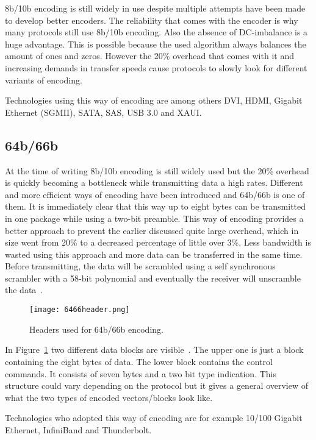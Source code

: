 8b/10b encoding is still widely in use despite multiple attempts have been made to develop better encoders. The reliability that comes with the encoder is why many protocols still use 8b/10b encoding. Also the absence of DC-imbalance is a huge advantage. This is possible because the used algorithm always balances the amount of ones and zeros. However the 20\% overhead that comes with it and increasing demands in transfer speeds cause protocols to slowly look for different variants of encoding.

Technologies using this way of encoding are among others DVI, HDMI, Gigabit Ethernet (SGMII), SATA, SAS, USB 3.0 and XAUI.


\subsection{64b/66b}
At the time of writing 8b/10b encoding is still widely used but the 20\% overhead is quickly becoming a bottleneck while transmitting data a high rates. Different and more efficient ways of encoding have been introduced and 64b/66b is one of them. It is immediately clear that this way up to eight bytes can be transmitted in one package while using a two-bit preamble. This way of encoding provides a better approach to prevent the earlier discussed quite large overhead, which in size went from 20\% to a decreased percentage of little over 3\%. Less bandwidth is wasted using this approach and more data can be transferred in the same time. Before transmitting, the data will be scrambled using a self synchronous scrambler with a 58-bit polynomial and eventually the receiver will unscramble the data~\cite{NIcoding}.

\begin{figure}[ht]
	\centering
	\texttt{[image: 6466header.png]}	
	\caption{Headers used for 64b/66b encoding.}
	\label{fig:6466header}
\end{figure} 

In Figure~\ref{fig:6466header} two different data blocks are visible~\cite{6466header}. The upper one is just a block containing the eight bytes of data. The lower block contains the control commands. It consists of seven bytes and a two bit type indication. This structure could vary depending on the protocol but it gives a general overview of what the two types of encoded vectors/blocks look like.  

Technologies who adopted this way of encoding are for example 10/100 Gigabit Ethernet, InfiniBand and Thunderbolt.


